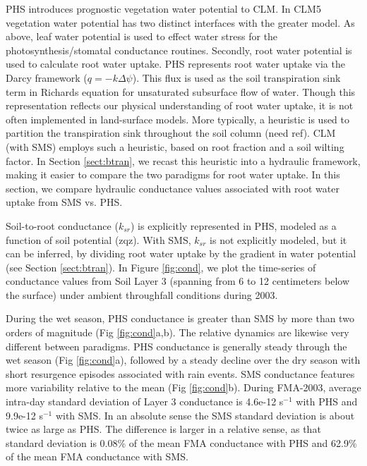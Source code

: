 \documentclass[draft,linenumbers]{agujournal}
\begin{document}
PHS introduces prognostic vegetation water potential to CLM.
In CLM5 vegetation water potential has two distinct interfaces with the greater model.
As above, leaf water potential is used to effect water stress for the photosynthesis/stomatal conductance routines.
Secondly, root water potential is used to calculate root water uptake.
PHS represents root water uptake via the Darcy framework ($q=-k\Delta\psi$).
This flux is used as the soil transpiration sink term in Richards equation for unsaturated subsurface flow of water.
Though this representation reflects our physical understanding of root water uptake, it is not often implemented in land-surface models.
More typically, a heuristic is used to partition the transpiration sink throughout the soil column (need ref).
CLM (with SMS) employs such a heuristic, based on root fraction and a soil wilting factor. 
In Section \ref{sect:btran}, we recast this heuristic into a hydraulic framework, making it easier to compare the two paradigms for root water uptake.
In this section, we compare hydraulic conductance values associated with root water uptake from SMS vs. PHS.

Soil-to-root conductance ($k_{sr}$) is explicitly represented in PHS, modeled as a function of soil potential (zqz).
With SMS, $k_{sr}$ is not explicitly modeled, but it can be inferred, by dividing root water uptake by the gradient in water potential (see Section \ref{sect:btran}).
In Figure \ref{fig:cond}, we plot the time-series of conductance values from Soil Layer 3 (spanning from 6 to 12 centimeters below the surface) under ambient throughfall conditions during 2003.

During the wet season, PHS conductance is greater than SMS by more than two orders of magnitude (Fig \ref{fig:cond}a,b).
The relative dynamics are likewise very different between paradigms.
PHS conductance is generally steady through the wet season (Fig \ref{fig:cond}a), followed by 
a steady decline over the dry season with short resurgence episodes associated with rain events.
SMS conductance features more variability relative to the mean (Fig \ref{fig:cond}b).
During FMA-2003, average intra-day standard deviation of Layer 3 conductance is 4.6e-12 s$^{-1}$ with PHS and 9.9e-12 s$^{-1}$ with SMS. 
In an absolute sense the SMS standard deviation is about twice as large as PHS.
The difference is larger in a relative sense, as that standard deviation is 0.08\% of the mean FMA conductance with PHS
and 62.9\% of the mean FMA conductance with SMS.
\end{document}

